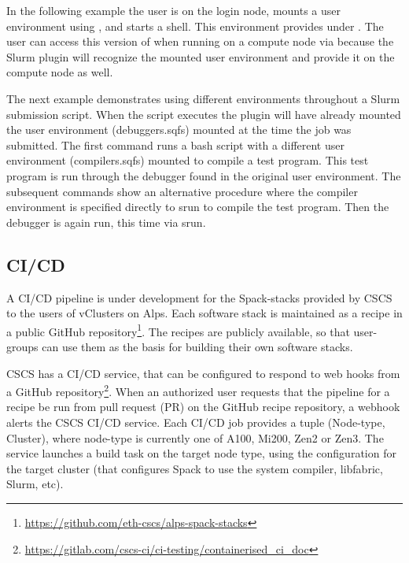 In the following example the user is on the login node, mounts a user environment using , and starts a  shell. 
This environment provides  under .
The user can access this version of  when running on a compute node via  because the Slurm plugin will recognize the mounted user environment and provide it on the compute node as well.



The next example demonstrates using different environments throughout a Slurm submission script.
When the script executes the plugin will have already mounted the user environment (debuggers.sqfs) mounted at the time the job was submitted.
The first command runs a bash script with a different user environment (compilers.sqfs) mounted to compile a test program.
This test program is run through the debugger found in the original user environment.
The subsequent commands show an alternative procedure where the compiler environment is specified directly to srun to compile the test program.
Then the debugger is again run, this time via srun.



\subsection{CI/CD}

A CI/CD pipeline is under development for the Spack-stacks provided by CSCS to the users of vClusters on Alps.
Each software stack is maintained as a \stackinator recipe in a public GitHub repository\footnote{\url{https://github.com/eth-cscs/alps-spack-stacks}}.
The recipes are publicly available, so that user-groups can use them as the basis for building their own software stacks.

CSCS has a CI/CD service, that can be configured to respond to web hooks from a GitHub repository\footnote{\url{https://gitlab.com/cscs-ci/ci-testing/containerised_ci_doc}}.
When an authorized user requests that the pipeline for a recipe be run from pull request (PR) on the GitHub recipe repository, a webhook alerts the CSCS CI/CD service.
Each CI/CD job provides a tuple {\sf (Node-type, Cluster)}, where node-type is currently one of A100, Mi200, Zen2 or Zen3.
The service launches a build task on the target node type, using the configuration for the target cluster (that configures Spack to use the system compiler, libfabric, Slurm, etc).

